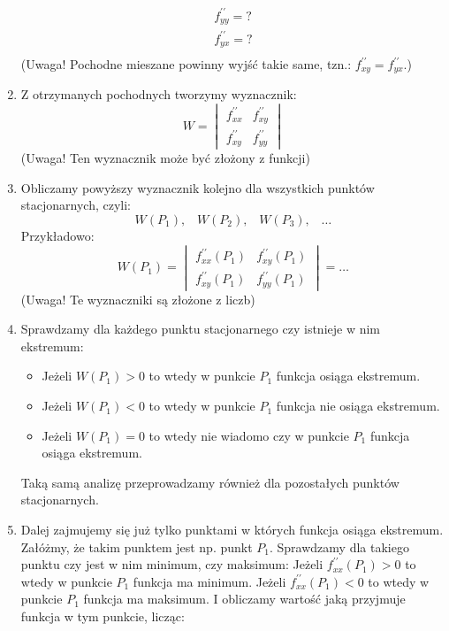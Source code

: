 \begin{enumerate}
\[\begin{matrix}
            f^{\prime\prime}_{yy}=? \\
            f^{\prime\prime}_{yx}=? \\
        \end{matrix}
    \]
    (Uwaga! Pochodne mieszane powinny wyjść takie same, tzn.: $f^{\prime\prime}_{xy}=f^{\prime\prime}_{yx}$.)
    \item  Z otrzymanych pochodnych tworzymy wyznacznik:
    \[
        W=
        \begin{vmatrix}
            f^{\prime\prime}_{xx} & f^{\prime\prime}_{xy} \\
            f^{\prime\prime}_{xy} & f^{\prime\prime}_{yy}
        \end{vmatrix}
    \]
    (Uwaga! Ten wyznacznik może być złożony z funkcji)
    \item Obliczamy powyższy wyznacznik kolejno dla wszystkich punktów stacjonarnych, czyli:
    \[
        W(P_1)\text{,}\quad W(P_2)\text{,}\quad W(P_3)\text{,}\quad \dots
    \]
    Przykładowo:
    \[
        W(P_1)=
        \begin{vmatrix}
            f^{\prime\prime}_{xx}(P_1) & f^{\prime\prime}_{xy}(P_1) \\
            f^{\prime\prime}_{xy}(P_1) & f^{\prime\prime}_{yy}(P_1)
        \end{vmatrix}
        = \dots
    \]
    (Uwaga! Te wyznaczniki są złożone z liczb)
    \item Sprawdzamy dla każdego punktu stacjonarnego czy istnieje w nim ekstremum:
    \begin{itemize}
        \item Jeżeli $W(P_1)>0$ to wtedy w punkcie $P_1$ funkcja osiąga ekstremum.
        \item Jeżeli $W(P_1)<0$ to wtedy w punkcie $P_1$ funkcja nie osiąga ekstremum.
        \item Jeżeli $W(P_1)=0$ to wtedy nie wiadomo czy w punkcie $P_1$ funkcja osiąga ekstremum.
    \end{itemize}
    Taką samą analizę przeprowadzamy również dla pozostałych punktów stacjonarnych.
    \item Dalej zajmujemy się już tylko punktami w których funkcja osiąga ekstremum.
    Załóżmy, że takim punktem jest np. punkt $P_1$.
    Sprawdzamy dla takiego punktu czy jest w nim minimum, czy maksimum:
    Jeżeli $f^{\prime\prime}_{xx}(P_1)>0$ to wtedy w punkcie $P_1$ funkcja ma minimum.
    Jeżeli $f^{\prime\prime}_{xx}(P_1)<0$ to wtedy w punkcie $P_1$ funkcja ma maksimum.
    I obliczamy wartość jaką przyjmuje funkcja w tym punkcie, licząc:

\end{enumerate}
